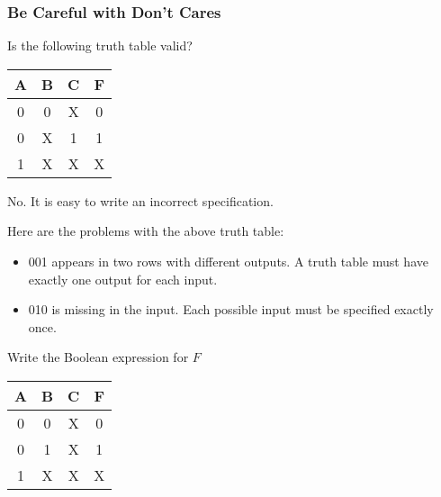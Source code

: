 \newpage
\begin{frame}\frametitle{Be Careful with Don't Cares}
\begin{tcolorbox}[enhanced,attach boxed title to top center={yshift=-3mm,yshifttext=-1mm},
  colback=blue!5!white,colframe=blue!75!black,colbacktitle=blue!80!black,
  title=Think About It,fonttitle=\bfseries,
  boxed title style={size=small,colframe=red!50!black} ]
Is the following truth table valid?
\begin{center}
    \begin{tabular}{ ccc|c}
    \hline 
    A & B & C & F  \\ \hline
    0 & 0 & X & 0  \\
    0 & X & 1 & 1  \\
    1 & X & X & X  \\
\end{tabular}
\end{center}
{\color{red} No.} It is easy to write an incorrect specification.

Here are the problems with the above truth table:
\begin{itemize}
\item 001 appears in two rows with different outputs. A truth table must have exactly one output for each input.
\item 010 is missing in the input. Each possible input must be specified exactly once.
\end{itemize}
\end{tcolorbox}
\end{frame}

\begin{frame}[fragile]
\begin{tcolorbox}[enhanced,attach boxed title to top center={yshift=-3mm,yshifttext=-1mm},
  colback=red!5!white,colframe=red!75!black,colbacktitle=red!80!black,
  title=Try this,fonttitle=\bfseries,
  boxed title style={size=small,colframe=red!50!black} ]
  Write the Boolean expression for $F$  
		\begin{center}
		\begin{tabular}{ccc|c}
		A&B&C & F\\
		\hline
		0&0&X & 0\\
		0&1&X & 1\\
		1&X&X & X\\
		\end{tabular}
		\end{center}
\end{tcolorbox}

\end{frame}

